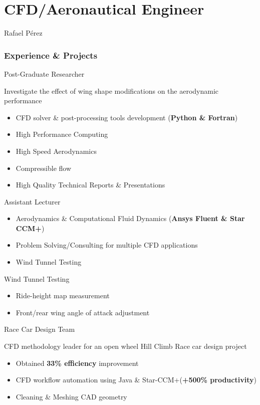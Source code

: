 \documentclass[fontsize=10pt]{tccv}
\begin{document}
\part{CFD/Aeronautical Engineer}{Rafael P\'erez}

\section{Experience \& Projects}
\begin{eventlist}
     {Post-Graduate Researcher}

Investigate the effect of wing shape modifications on
the aerodynamic performance
\begin{itemize}
	\itemsep -2pt
	\item CFD solver \& post-processing tools development (\textbf{Python \& Fortran}) 
	\item High Performance Computing
	\item High Speed Aerodynamics
	\item Compressible flow
	\item High Quality Technical Reports \& Presentations
\end{itemize}

	{Assistant Lecturer}
\begin{itemize}
	\itemsep -2pt
	\item Aerodynamics \& Computational Fluid Dynamics (\textbf{Ansys Fluent \& Star
	CCM+})
	\item Problem Solving/Consulting for multiple CFD applications
	\item Wind Tunnel Testing
\end{itemize}

     {Wind Tunnel Testing}
     \begin{itemize}
	\itemsep -2pt
     	\item Ride-height map measurement
     	\item Front/rear wing angle of attack adjustment
     \end{itemize}

     {Race Car Design Team}

CFD methodology leader for an open wheel Hill Climb Race car design project
     \begin{itemize}
	\itemsep -2pt
     	\item Obtained \textbf{33\% efficiency} improvement
     	\item CFD workflow automation using Java \& Star-CCM+(\textbf{+500\% productivity})
	\item Cleaning \& Meshing CAD geometry
     \end{itemize}


\end{eventlist}
\end{document}
